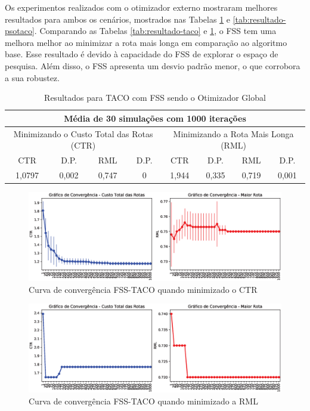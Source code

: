 Os experimentos realizados com o otimizador externo mostraram melhores resultados para ambos os cenários, mostrados nas Tabelas \ref{tab:resultado-fsstaco} e \ref{tab:resultado-psotaco}. Comparando as Tabelas \ref{tab:resultado-taco} e \ref{tab:resultado-fsstaco}, o FSS tem uma melhora melhor ao minimizar a rota mais longa em comparação ao algoritmo base. Esse resultado é devido à capacidade do FSS de explorar o espaço de pesquisa. Além disso, o FSS apresenta um desvio padrão menor, o que corrobora a sua robustez.

\begin{table}[htb]
    \centering
    \caption{Resultados para TACO com FSS sendo o Otimizador Global} \label{tab:resultado-fsstaco}
\begin{tabular}{|c|c|c|c|c|c|c|c|}
\hline
\multicolumn{8}{|c|}{Média de 30 simulações com 1000 iterações}                                                            \\ \hline
\multicolumn{4}{|c|}{Minimizando o Custo Total das Rotas (CTR)} & \multicolumn{4}{c|}{Minimizando a Rota Mais Longa (RML)} \\ \hline
CTR             & D.P.           & RML           & D.P.         & CTR          & D.P.         & RML          & D.P.        \\ \hline
1,0797          & 0,002          & 0,747         & 0            & 1,944        & 0,335        & 0,719        & 0,001       \\ \hline
\end{tabular}
\end{table}

\begin{figure}[htb]
    \centering
    \caption{Curva de convergência FSS-TACO quando minimizado o CTR} \label{fig:resultados-convergencia-fss-tcr}
    \includegraphics[width=\textwidth]{imagens/convergence-totalcost-fsstaco.eps}
\end{figure}

\begin{figure}[htb]
    \centering
    \caption{Curva de convergência FSS-TACO quando minimizado a RML} \label{fig:resultados-convergencia-fss-rml}
    \includegraphics[width=\textwidth]{imagens/convergence-maxcost-fsstaco.eps}
\end{figure}


